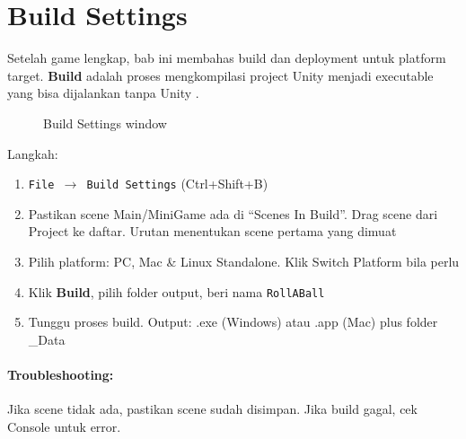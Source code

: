 \section{Build Settings}

Setelah game lengkap, bab ini membahas build dan deployment untuk platform target. \textbf{Build} adalah proses mengkompilasi project Unity menjadi executable yang bisa dijalankan tanpa Unity \cite{unityManual}.

\begin{figure}[htbp]
\centering
{}
\caption{Build Settings window}
\label{fig:build-settings}
\end{figure}

Langkah:

\begin{enumerate}
  \item \texttt{File $\rightarrow$ Build Settings} (Ctrl+Shift+B)
  \item Pastikan scene Main/MiniGame ada di ``Scenes In Build''. Drag scene dari Project ke daftar. Urutan menentukan scene pertama yang dimuat
  \item Pilih platform: PC, Mac \& Linux Standalone. Klik Switch Platform bila perlu
  \item Klik \textbf{Build}, pilih folder output, beri nama \texttt{RollABall}
  \item Tunggu proses build. Output: .exe (Windows) atau .app (Mac) plus folder \_Data
\end{enumerate}

\paragraph{Troubleshooting:} Jika scene tidak ada, pastikan scene sudah disimpan. Jika build gagal, cek Console untuk error.

